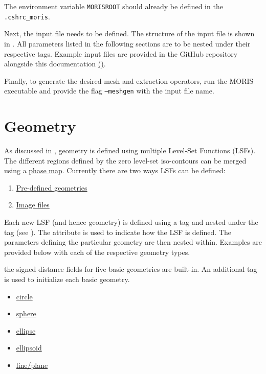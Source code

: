 \vspace{-0.5cm}

The environment variable \texttt{MORISROOT} should already be defined in the \texttt{.cshrc\_moris}.

Next, the input file needs to be defined. The structure of the input file is shown in . All parameters listed in the following sections are to be nested under their respective tags. Example input files are provided in the GitHub repository alongside this documentation \href{https://github.com/kkmaute/moris/tree/main/share/doc/mesh_generation/examples}{(\ExternalLink)}.

Finally, to generate the desired mesh and extraction operators, run the MORIS executable and provide the flag \texttt{---meshgen} with the input file name. 



\section{Geometry}
\label{sec:tutorial_geometry}

As discussed in , geometry is defined using multiple Level-Set Functions (LSFs). The different regions defined by the zero level-set iso-contours can be merged using a \hyperlink{phase_map}{phase map}. Currently there are two ways LSFs can be defined:
\begin{enumerate}
    \item \hyperlink{pre_defined}{Pre-defined geometries}
    \item \hyperlink{image_file}{Image files}
\end{enumerate}
Each new LSF (and hence geometry) is defined using a  tag and nested under the  tag (see ). The  attribute is used to indicate how the LSF is defined. The parameters defining the particular geometry are then nested within. Examples are provided below with each of the respective geometry types.

 the signed distance fields for five basic geometries are built-in. An additional  tag is used to initialize each basic geometry.
\begin{itemize}
    \item \hyperlink{circle}{circle}
    \item \hyperlink{sphere}{sphere}
    \item \hyperlink{ellipse}{ellipse}
    \item \hyperlink{ellipsoid}{ellipsoid}
    \item \hyperlink{plane}{line/plane}
\end{itemize}

